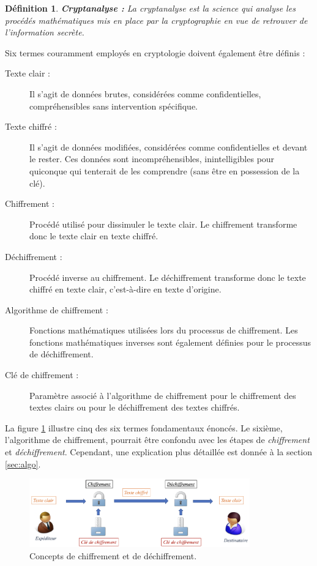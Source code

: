 \documentclass[oneside]{book}
\newtheorem{definition}{Définition}[section]
\begin{document}
\begin{definition}{\textbf{Cryptanalyse : }}
La cryptanalyse est la science qui analyse les procédés mathématiques mis en place par la cryptographie en vue de retrouver de l'information secrète. 
\end{definition}

\hspace{-0.5cm}Six termes couramment employés en cryptologie doivent également être définis : 
\begin{description}
\item[Texte clair :] Il s'agit de données brutes, considérées comme confidentielles, compréhensibles sans intervention spécifique.
\item[Texte chiffré :] Il s'agit de données modifiées, considérées comme confidentielles et devant le rester. Ces données sont incompréhensibles, inintelligibles pour quiconque qui tenterait de les comprendre (sans être en possession de la clé). 
\item[Chiffrement :] Procédé utilisé pour dissimuler le texte clair. Le chiffrement transforme donc le texte clair en texte chiffré.
\item[Déchiffrement :] Procédé inverse au chiffrement. Le déchiffrement transforme donc le texte chiffré en texte clair, c'est-à-dire en texte d'origine.
\item[Algorithme de chiffrement :] Fonctions mathématiques utilisées lors du processus de chiffrement. Les fonctions mathématiques inverses sont également définies pour le processus de déchiffrement.
\item[Clé de chiffrement :] Paramètre associé à l'algorithme de chiffrement pour le chiffrement des textes clairs ou pour le déchiffrement des textes chiffrés. \\
\end{description}

\hspace{-0.5cm}La figure \ref{fig:fondamentaux_crypto} illustre cinq des six termes fondamentaux énoncés. Le sixième, l'algorithme de chiffrement, pourrait être confondu avec les étapes de \textit{chiffrement} et \textit{déchiffrement}. Cependant, une explication plus détaillée est donnée à la section \ref{sec:algo}.

\begin{figure}[htbp]
    \centering
    \includegraphics[width=0.85\textwidth]{image/fondamentaux_crypto}
    \caption{Concepts de chiffrement et de déchiffrement.}
    \label{fig:fondamentaux_crypto}
\end{figure}
\end{document}

